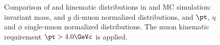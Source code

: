 \begin{figure}[h]
\begin{center}
    \caption{Comparison of \PgUa and \PgUb kinematic distributions in \PbPb and \pp MC simulation: 
invariant mass, \pt and $y$ di-muon normalized distributions, and 
$\pt$, $\eta$ and $\phi$ single-muon normalized distributions.
The muon kinematic requirement $\pt > 4.0\GeVc$ is applied. 
}
    \label{fig:muon_properties_4_0}
  \end{center}
\end{figure}

\begin{figure}[h]
  \begin{center}
    \\
%

\end{center}
\end{figure}
